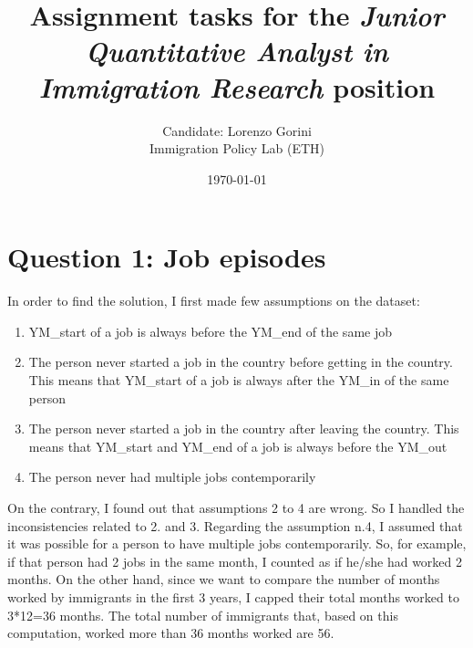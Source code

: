 \documentclass{article}
\title{\vspace{-30}Assignment tasks for the \textit{Junior Quantitative Analyst in Immigration Research} position}
\author{Candidate: Lorenzo Gorini\\Immigration Policy Lab (ETH)}
\date{\vspace{-10}\today}
\begin{document}
	\maketitle
	\section{Question 1: Job episodes}
	In order to find the solution, I first made few assumptions on the dataset:
	\begin{enumerate}
		\item YM\_start of a job is always before the YM\_end of the same job
		\item The person never started a job in the country before getting in the
		country. This means that YM\_start of a job is always after the YM\_in of
		the same person
		\item The person never started a job in the country after leaving the
		country. This means that YM\_start and YM\_end of a job is always before
		the YM\_out
		\item The person never had multiple jobs contemporarily
	\end{enumerate}
	
	On the contrary, I found out that assumptions 2 to 4 are wrong. So I handled the inconsistencies related to 2. and 3. Regarding the assumption n.4, I assumed that it was possible for a person to have multiple jobs contemporarily. 
	So, for example, if that person had 2 jobs in the same month, I counted as if he/she had worked 2 months. On the other hand, since we want to compare the number of months worked by immigrants in the first 3 years, I capped their total months worked to 3*12=36 months. The total number of immigrants that, based on this computation, worked more than 36 months worked are 56.
	
\end{document}
